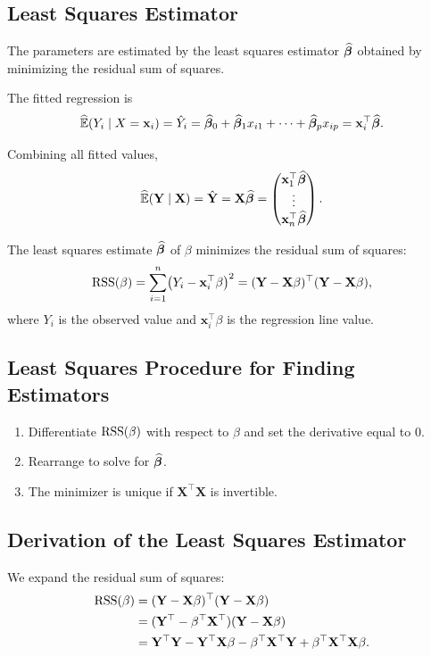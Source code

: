 \subsection{Least Squares Estimator}

The parameters are estimated by the least squares estimator $\widehat{\boldsymbol{\beta}}$ obtained by minimizing the residual sum of squares.

The fitted regression is
\[
\widehat{\mathbb{E}}(Y_i \mid X = \mathbf{x}_i)
= \hat{Y}_i
= \widehat{\boldsymbol{\beta}}_0 + \widehat{\boldsymbol{\beta}}_1 x_{i1} + \cdots + \widehat{\boldsymbol{\beta}}_p x_{ip}
= \mathbf{x}_i^\top \widehat{\boldsymbol{\beta}}.
\]

Combining all fitted values,
\[
\widehat{\mathbb{E}}(\mathbf{Y} \mid \mathbf{X})
= \hat{\mathbf{Y}}
= \mathbf{X}\widehat{\boldsymbol{\beta}}
=
\begin{pmatrix}
\mathbf{x}_1^\top \widehat{\boldsymbol{\beta}} \\
\vdots \\
\mathbf{x}_n^\top \widehat{\boldsymbol{\beta}}
\end{pmatrix}.
\]

The least squares estimate $\widehat{\boldsymbol{\beta}}$ of $\beta$ minimizes the residual sum of squares:
\[
\mathrm{RSS}(\beta)
= \sum_{i=1}^n \bigl(Y_i - \mathbf{x}_i^{\top}\beta\bigr)^2
= (\mathbf{Y} - \mathbf{X}\beta)^{\top}(\mathbf{Y} - \mathbf{X}\beta),
\]
where $Y_i$ is the observed value and $\mathbf{x}_i^{\top}\beta$ is the regression line value.

\subsection{Least Squares Procedure for Finding Estimators}

\begin{enumerate}
    \item Differentiate $\mathrm{RSS}(\beta)$ with respect to $\beta$ and set the derivative equal to $0$.
    \item Rearrange to solve for $\widehat{\boldsymbol{\beta}}$.
    \item The minimizer is unique if $\mathbf{X}^{\top}\mathbf{X}$ is invertible.
\end{enumerate}

\subsection{Derivation of the Least Squares Estimator}

We expand the residual sum of squares:
\[
\begin{aligned}
\mathrm{RSS}(\beta)
&= (\mathbf{Y} - \mathbf{X}\beta)^{\top}(\mathbf{Y} - \mathbf{X}\beta) \\
&= (\mathbf{Y}^{\top} - \beta^{\top} \mathbf{X}^{\top})(\mathbf{Y} - \mathbf{X}\beta) \\
&= \mathbf{Y}^{\top}\mathbf{Y} - \mathbf{Y}^{\top}\mathbf{X}\beta - \beta^{\top}\mathbf{X}^{\top}\mathbf{Y} + \beta^{\top}\mathbf{X}^{\top}\mathbf{X}\beta.
\end{aligned}
\]


